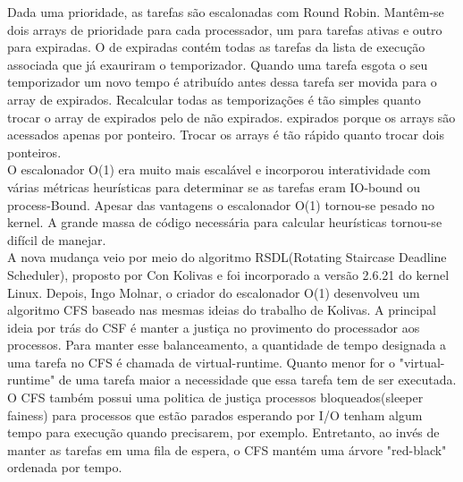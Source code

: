 \documentclass[conference]{IEEEtran}
\begin{document}
Dada uma prioridade, as tarefas são escalonadas com Round Robin. Mantêm-se dois arrays de prioridade para cada processador, um para tarefas ativas e outro para expiradas. O de expiradas contém todas as tarefas da lista de execução associada que já exauriram o temporizador. Quando uma tarefa esgota o seu temporizador um novo tempo é atribuído antes dessa tarefa ser movida para o array de expirados. Recalcular todas as temporizações é tão simples quanto trocar o array de expirados pelo de não expirados. expirados porque os arrays são acessados apenas por ponteiro. Trocar os arrays é tão rápido quanto trocar dois ponteiros\cite{LinuxSchedulerMIT}.\\

O escalonador O(1) era muito mais escalável e incorporou interatividade com várias métricas heurísticas para determinar se as tarefas eram IO-bound ou process-Bound. Apesar das vantagens o escalonador O(1) tornou-se pesado no kernel. A grande massa de código necessária para calcular heurísticas tornou-se difícil de manejar.\\

A nova mudança veio por meio do algoritmo RSDL(Rotating Staircase Deadline Scheduler), proposto por Con Kolivas e foi incorporado a versão 2.6.21 do kernel Linux. Depois, Ingo Molnar, o criador do escalonador O(1) desenvolveu um algoritmo CFS baseado nas mesmas ideias do trabalho de Kolivas. A principal ideia por trás do CSF é manter a justiça no provimento do processador aos processos. Para manter esse balanceamento, a quantidade de tempo designada a uma tarefa no CFS é chamada de virtual-runtime. Quanto menor for o "virtual-runtime" de uma tarefa maior a necessidade que essa tarefa tem de ser executada.\\
 
O CFS também possui uma politica de justiça processos bloqueados(sleeper fainess) para processos que estão parados esperando por I/O tenham algum tempo para execução quando precisarem, por exemplo. Entretanto, ao invés de manter as tarefas em uma fila de espera, o CFS mantém uma árvore "red-black" ordenada por tempo.\\
\end{document}
